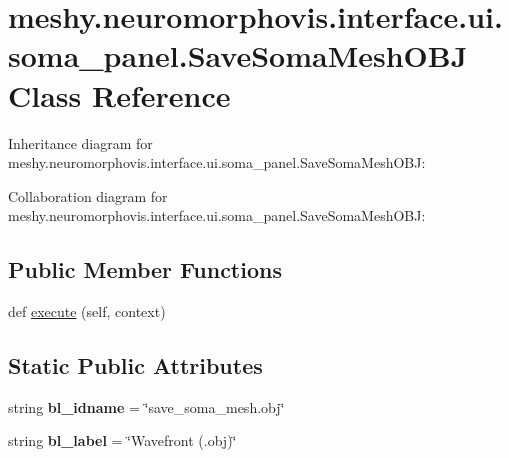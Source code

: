 \hypertarget{classmeshy_1_1neuromorphovis_1_1interface_1_1ui_1_1soma__panel_1_1SaveSomaMeshOBJ}{}\section{meshy.\+neuromorphovis.\+interface.\+ui.\+soma\+\_\+panel.\+Save\+Soma\+Mesh\+O\+BJ Class Reference}
\label{classmeshy_1_1neuromorphovis_1_1interface_1_1ui_1_1soma__panel_1_1SaveSomaMeshOBJ}


Inheritance diagram for meshy.\+neuromorphovis.\+interface.\+ui.\+soma\+\_\+panel.\+Save\+Soma\+Mesh\+O\+BJ\+:


Collaboration diagram for meshy.\+neuromorphovis.\+interface.\+ui.\+soma\+\_\+panel.\+Save\+Soma\+Mesh\+O\+BJ\+:
\subsection*{Public Member Functions}
\begin{DoxyCompactItemize}
\item 
def \hyperlink{classmeshy_1_1neuromorphovis_1_1interface_1_1ui_1_1soma__panel_1_1SaveSomaMeshOBJ_a600eba5f7788411630cfdbf32e3c6047}{execute} (self, context)
\end{DoxyCompactItemize}
\subsection*{Static Public Attributes}
\begin{DoxyCompactItemize}
\item 
string {\bfseries bl\+\_\+idname} = \char`\"{}save\+\_\+soma\+\_\+mesh.\+obj\char`\"{}\hypertarget{classmeshy_1_1neuromorphovis_1_1interface_1_1ui_1_1soma__panel_1_1SaveSomaMeshOBJ_a0a4aa158a213a95137923b27a26c7498}{}\label{classmeshy_1_1neuromorphovis_1_1interface_1_1ui_1_1soma__panel_1_1SaveSomaMeshOBJ_a0a4aa158a213a95137923b27a26c7498}

\item 
string {\bfseries bl\+\_\+label} = \char`\"{}Wavefront (.obj)\char`\"{}\hypertarget{classmeshy_1_1neuromorphovis_1_1interface_1_1ui_1_1soma__panel_1_1SaveSomaMeshOBJ_af8ea7815a85f5ddaaddac12364e0ff98}{}\label{classmeshy_1_1neuromorphovis_1_1interface_1_1ui_1_1soma__panel_1_1SaveSomaMeshOBJ_af8ea7815a85f5ddaaddac12364e0ff98}

\end{DoxyCompactItemize}


